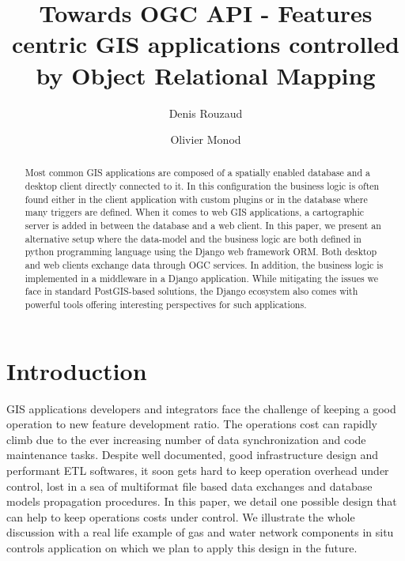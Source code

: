 \documentclass[runningheads]{llncs}
\begin{document}
%
\title{Towards OGC API - Features centric GIS applications controlled by Object Relational Mapping}

%
%
\author{Denis Rouzaud \and
Olivier Monod}
%
%
%
\maketitle              %
%
\begin{abstract}
Most common GIS applications are composed of a spatially enabled database and a desktop client directly connected to it. In this configuration the business logic is often found either in the client application with custom plugins or in the database where many triggers are defined. When it comes to web GIS applications, a cartographic server is added in between the database and a web client. In this paper, we present an alternative setup where the data-model and the business logic are both defined in python programming language using the Django web framework ORM. Both desktop and web clients exchange data through OGC services.  In addition, the business logic is implemented in a middleware in a Django application. While mitigating the issues we face in standard PostGIS-based solutions, the Django ecosystem also comes with powerful tools offering interesting perspectives for such applications.

\end{abstract}
%
%
%
\section{Introduction}

GIS applications developers and integrators face the challenge of keeping a good operation to new feature development ratio. The operations cost can rapidly climb due to the ever increasing number of data synchronization and code maintenance tasks. Despite well documented, good infrastructure design and performant ETL softwares, it soon gets hard to keep operation overhead under control, lost in a sea of multiformat file based data exchanges and database models propagation procedures. In this paper, we detail one possible design that can help to keep operations costs under control. We illustrate the whole discussion with a real life example of gas and water network components in situ controls application on which we plan to apply this design in the future.
\end{document}
